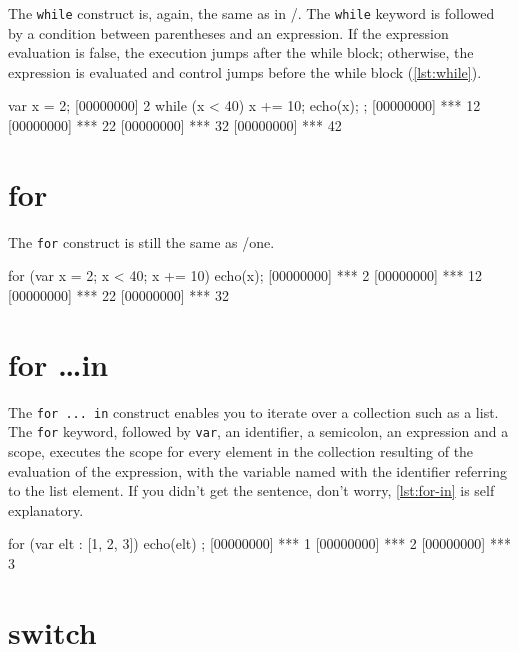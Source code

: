 \documentclass[openright,twoside,12pt]{report}
\begin{document}
The \texttt{while} construct is, again, the same as in \C/\Cxx. The
\texttt{while} keyword is followed by a condition between parentheses
and an expression. If the expression evaluation is false, the
execution jumps after the while block; otherwise, the expression is
evaluated and control jumps before the while block (\autoref{lst:while}).

\begin{urbiscript}[caption=The \texttt{while} construct,
label=lst:while]
var x = 2;
[00000000] 2
while (x < 40)
{
  x += 10;
  echo(x);
};
[00000000] *** 12
[00000000] *** 22
[00000000] *** 32
[00000000] *** 42
\end{urbiscript}

\section{for}

The \texttt{for} construct is still the same as \C/\Cxx one.

\begin{urbiscript}[caption=Nihil novi sub sole, label=lst:for]
for (var x = 2; x < 40; x += 10)
  echo(x);
[00000000] *** 2
[00000000] *** 12
[00000000] *** 22
[00000000] *** 32
\end{urbiscript}

\section{for \ldots in}

The \texttt{for ... in} construct enables you to iterate over a
collection such as a list. The \texttt{for} keyword, followed by
\lstinline|var|, an identifier, a semicolon, an expression and a
scope, executes the scope for every element in the collection
resulting of the evaluation of the expression, with the variable named
with the identifier referring to the list element. If you didn't get
the sentence, don't worry, \autoref{lst:for-in} is self explanatory.

\begin{urbiscript}[caption=Collection iteration with \texttt{for},
label=lst:for-in]
for (var elt : [1, 2, 3]) { echo(elt) };
[00000000] *** 1
[00000000] *** 2
[00000000] *** 3
\end{urbiscript}

\section{switch}
\end{document}
